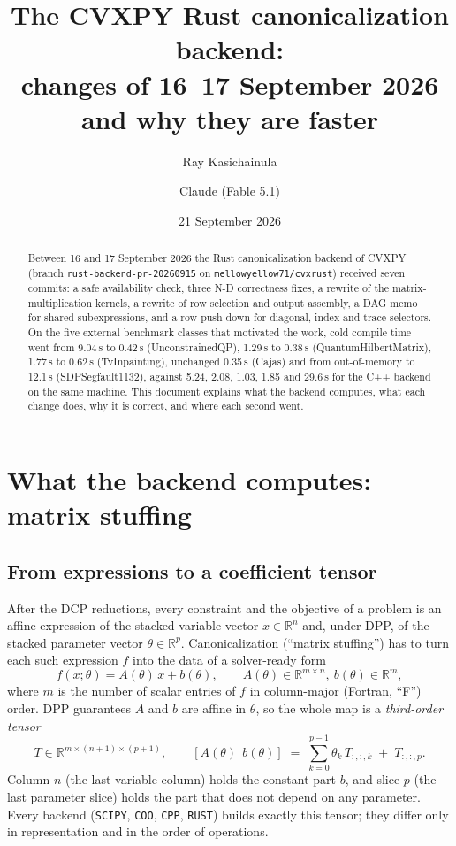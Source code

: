 \documentclass[11pt,a4paper]{article}
\title{The CVXPY Rust canonicalization backend:\\ changes of 16--17 September 2026 and why they are faster}
\author{Ray Kasichainula \and Claude (Fable 5.1)}
\date{21 September 2026}
\newcommand{\R}{\mathbb{R}}
\newcommand{\code}[1]{\texttt{#1}}
\begin{document}
\maketitle

\begin{abstract}
Between 16 and 17 September 2026 the Rust canonicalization backend of CVXPY (branch
\code{rust-backend-pr-20260915} on \code{mellowyellow71/cvxrust}) received seven commits: a safe
availability check, three N-D correctness fixes, a rewrite of the matrix-multiplication kernels, a
rewrite of row selection and output assembly, a DAG memo for shared subexpressions, and a row
push-down for diagonal, index and trace selectors. On the five external benchmark classes that
motivated the work, cold compile time went from 9.04\,s to 0.42\,s (UnconstrainedQP), 1.29\,s to
0.38\,s (QuantumHilbertMatrix), 1.77\,s to 0.62\,s (TvInpainting), unchanged 0.35\,s (Cajas) and
from out-of-memory to 12.1\,s (SDPSegfault1132), against 5.24, 2.08, 1.03, 1.85 and 29.6\,s for the
C++ backend on the same machine. This document explains what the backend computes, what each change
does, why it is correct, and where each second went.
\end{abstract}

\tableofcontents

\section{What the backend computes: matrix stuffing}
\label{sec:stuffing}

\subsection{From expressions to a coefficient tensor}

After the DCP reductions, every constraint and the objective of a problem is an affine expression of
the stacked variable vector $x \in \R^n$ and, under DPP, of the stacked parameter vector
$\theta \in \R^p$. Canonicalization (``matrix stuffing'') has to turn each such expression $f$ into
the data of a solver-ready form
\begin{equation}
  f(x;\theta) = A(\theta)\,x + b(\theta), \qquad A(\theta) \in \R^{m \times n},\ b(\theta) \in \R^{m},
\end{equation}
where $m$ is the number of scalar entries of $f$ in column-major (Fortran, ``F'') order. DPP
guarantees $A$ and $b$ are affine in $\theta$, so the whole map is a \emph{third-order tensor}
\begin{equation}
  \label{eq:tensor}
  T \in \R^{m \times (n+1) \times (p+1)}, \qquad
  [A(\theta)\ \ b(\theta)] \;=\; \sum_{k=0}^{p-1} \theta_k\, T_{:,:,k} \;+\; T_{:,:,p}.
\end{equation}
Column $n$ (the last variable column) holds the constant part $b$, and slice $p$ (the last parameter
slice) holds the part that does not depend on any parameter. Every backend
(\code{SCIPY}, \code{COO}, \code{CPP}, \code{RUST}) builds exactly this tensor; they differ only in
representation and in the order of operations.
\end{document}
